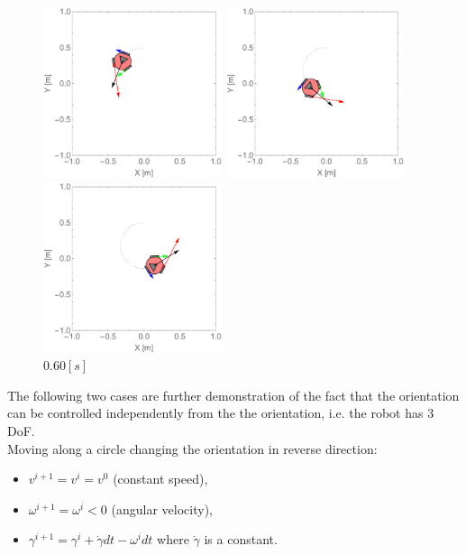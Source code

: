 \documentclass[12pt,english]{article}
\begin{document}
\begin{figure}[htb!]
	\centering
	\includegraphics[height=5cm]{figures/2d_simulation/animations/2D_move_along_circle_rotating_car_like/20}
	\caption{$0.20[s]$}
	\endminipage\hfill
	\centering
	\includegraphics[height=5cm]{figures/2d_simulation/animations/2D_move_along_circle_rotating_car_like/40}
	\caption{$0.40[s]$}
	\endminipage\hfill
	\centering
	\includegraphics[height=5cm]{figures/2d_simulation/animations/2D_move_along_circle_rotating_car_like/60}
	\caption{$0.60[s]$}
	\endminipage\hfill
\end{figure}
\newpage
The following two cases are further demonstration of the fact that the orientation can be controlled independently from the the orientation, i.e. the robot has 3 DoF. \\[0.3cm]
\noindent Moving along a circle changing the orientation in reverse direction:
\begin{itemize}
	\item $v^{i+1} = v^{i} = v^{0}$ (constant speed),
	\item $\omega^{i+1} = \omega^{i}<0$ (angular velocity),
	\item $\gamma^{i+1} = \gamma^i + \dot \gamma dt -\omega^i dt$ where $\dot \gamma$ is a constant.
\end{itemize}
\end{document}
